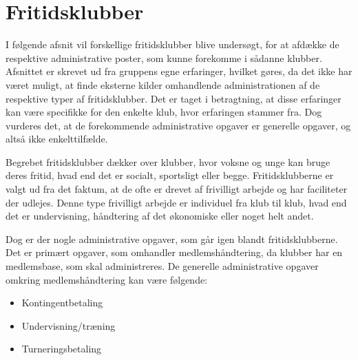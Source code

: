 \chapter{Fritidsklubber} \label{chap:Fritidsklubber}

I følgende afsnit vil forskellige fritidsklubber blive undersøgt, for at afdække de respektive administrative poster, som kunne forekomme i sådanne klubber. 
Afsnittet er skrevet ud fra gruppens egne erfaringer, hvilket gøres, da det ikke har været muligt, at finde eksterne kilder omhandlende administrationen af de respektive typer af fritidsklubber.  
Det er taget i betragtning, at disse erfaringer kan være specifikke for den enkelte klub, hvor erfaringen stammer fra. 
Dog vurderes det, at de forekommende administrative opgaver er generelle opgaver, og altså ikke enkelttilfælde.

Begrebet fritidsklubber dækker over klubber, hvor voksne og unge kan bruge deres fritid, hvad end det er socialt, sportsligt eller begge. 
Fritidsklubberne er valgt ud fra det faktum, at de ofte er drevet af frivilligt arbejde og har faciliteter der udlejes. 
Denne type frivilligt arbejde er individuel fra klub til klub, hvad end det er undervisning, håndtering af det økonomiske eller noget helt andet. 

Dog er der nogle administrative opgaver, som går igen blandt fritidsklubberne.
Det er primært opgaver, som omhandler medlemshåndtering, da klubber har en medlemsbase, som skal administreres. 
De generelle administrative opgaver omkring medlemshåndtering kan være følgende:
\begin{itemize}
	\item Kontingentbetaling
	\item Undervisning/træning
	\item Turneringsbetaling
\end{itemize}


